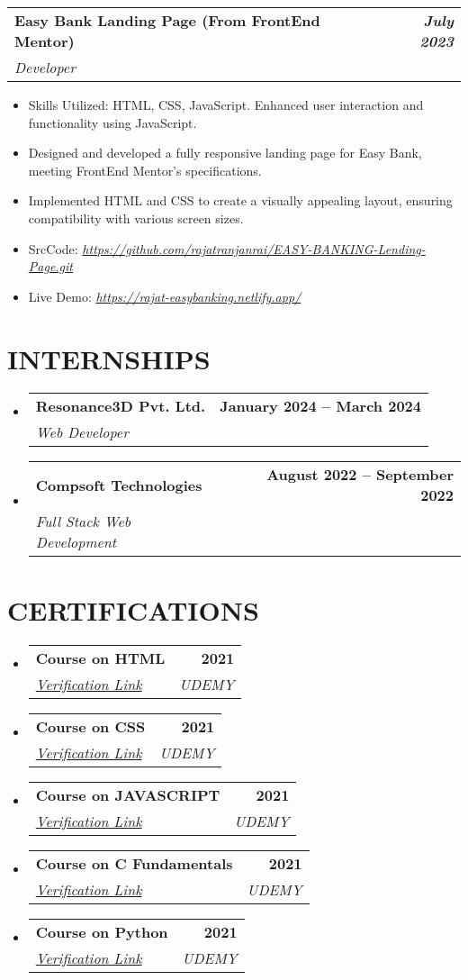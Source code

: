\documentclass[letterpaper,11pt]{article}
\makeatletter
\newcommand{\resumeItem}[1]{
  \item\small{
    {#1 \vspace{-2pt}}
  }
}
\newcommand{\resumeSubheading}[4]{
  \vspace{-2pt}\item
    \begin{tabular*}{1.0\textwidth}[t]{l@{\extracolsep{\fill}}r}
      \textbf{#1} & \textbf{\small #2} \\
      \textit{\small#3} & \textit{\small #4} \\
    \end{tabular*}\vspace{-7pt}
}
\newcommand{\resumeSubHeadingListStart}{\begin{itemize}[leftmargin=0.0in, label={}]}
\newcommand{\resumeSubHeadingListEnd}{\end{itemize}}
\newcommand{\resumeItemListStart}{\begin{itemize}}
\newcommand{\resumeItemListEnd}{\end{itemize}\vspace{-5pt}}
\makeatother
\begin{document}
    \resumeSubheading
{Easy Bank Landing Page (From FrontEnd Mentor)}{\textit{July 2023}}
{Developer}{}
\resumeItemListStart
    \resumeItem{Skills Utilized: HTML, CSS, JavaScript. Enhanced user interaction and functionality using JavaScript.}
    \resumeItem{Designed and developed a fully responsive landing page for Easy Bank, meeting FrontEnd Mentor's specifications.}
    \resumeItem{Implemented HTML and CSS to create a visually appealing layout, ensuring compatibility with various screen sizes.}
    \resumeItem{SrcCode: \href{https://github.com/rajatranjanrai/EASY-BANKING-Lending-Page.git}{\textit{https://github.com/rajatranjanrai/EASY-BANKING-Lending-Page.git}}}
    \resumeItem{Live Demo: \href{https://rajat-easybanking.netlify.app/}{\textit{https://rajat-easybanking.netlify.app/}}}
\resumeItemListEnd

\vspace{5pt}



\section{INTERNSHIPS}
  \resumeSubHeadingListStart
    \resumeSubheading
      {Resonance3D Pvt. Ltd.}{January 2024 -- March 2024}
      {Web Developer}{}
    \resumeSubheading
      {Compsoft Technologies}{August 2022 -- September 2022}
      {Full Stack Web Development}{}
  \resumeSubHeadingListEnd


\section{CERTIFICATIONS}
  \resumeSubHeadingListStart
    \resumeSubheading
      {Course on HTML}{2021}
      {\href{http://ude.my/UC-64198ff3-c0cd-4354-922b-a0c610b02116}{Verification Link}}{UDEMY}
    \resumeSubheading
      {Course on CSS}{2021}
      {\href{http://ude.my/UC-64198ff3-c0cd-4354-922b-a0c610b02116}{Verification Link}}{UDEMY}
      \resumeSubheading
      {Course on JAVASCRIPT}{2021}
      {\href{http://ude.my/UC-64198ff3-c0cd-4354-922b-a0c610b02116}{Verification Link}}{UDEMY}
      \resumeSubheading
      {Course on C Fundamentals}{2021}
      {\href{http://ude.my/UC-64198ff3-c0cd-4354-922b-a0c610b02116}{Verification Link}}{UDEMY}
      \resumeSubheading
      {Course on Python}{2021}
      {\href{http://ude.my/UC-3b24818b-b8cd-4e6d-86d4-5f554d9f8580}{Verification Link}}{UDEMY}
  \resumeSubHeadingListEnd
\end{document}
